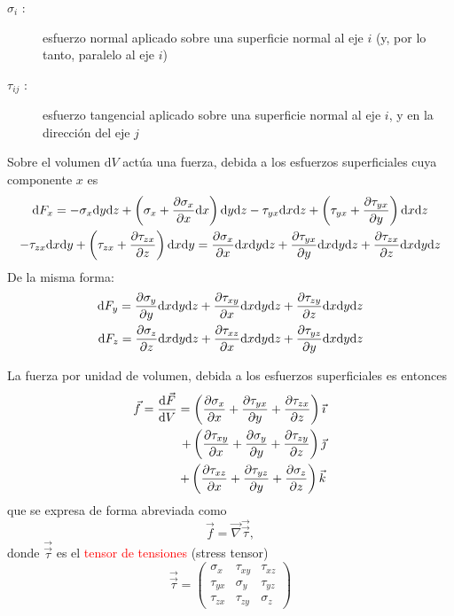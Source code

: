 \begin{description}
	\item[$\sigma_i$ :] esfuerzo normal aplicado sobre una superficie normal al eje $i$ (y, por lo tanto, paralelo al eje $i$)
	\item[$\tau_{ij}$ :] esfuerzo tangencial aplicado sobre una superficie normal al eje $i$, y en la direcci\'on del eje $j$
\end{description} 

\begin{center}
%	

\end{center}

Sobre el volumen $\text{d} V$ act\'ua una fuerza, debida a los esfuerzos superficiales cuya componente $x$ es
\begin{multline*}
	\text{d} F_x = -\sigma_x  \text{d} y \text{d} z + \left(\sigma_x + \frac{\partial \sigma_x}{\partial x} \text{d} x\right) \text{d} y \text{d} z - \tau_{yx} \text{d} x \text{d} z + \left(\tau_{yx} + \frac{\partial \tau_{yx}}{\partial y}\right) \text{d} x \text{d} z \\
	- \tau_{zx} \text{d} x \text{d} y + \left(\tau_{zx} + \frac{\partial \tau_{zx}}{\partial z}\right) \text{d} x \text{d} y
	= \frac{\partial \sigma_x}{\partial x} \text{d} x \text{d} y \text{d} z + \frac{\partial \tau_{yx}}{\partial y} \text{d} x \text{d} y \text{d} z + \frac{\partial \tau_{zx}}{\partial z}
	\text{d} x \text{d} y \text{d} z
\end{multline*}
De la misma forma:
\begin{eqnarray*}
	\text{d} F_y = \frac{\partial \sigma_y}{\partial y} \text{d} x \text{d} y \text{d} z + \frac{\partial \tau_{xy}}{\partial x} \text{d} x \text{d} y \text{d} z + \frac{\partial \tau_{zy}}{\partial z} \text{d} x \text{d} y \text{d} z \\
	\text{d} F_z = \frac{\partial \sigma_z}{\partial z} \text{d} x \text{d} y \text{d} z + \frac{\partial \tau_{xz}}{\partial x} \text{d} x \text{d} y \text{d} z + \frac{\partial \tau_{yz}}{\partial y} \text{d} x \text{d} y \text{d} z
\end{eqnarray*}

La fuerza por unidad de volumen, debida a los esfuerzos superficiales es entonces
\begin{eqnarray*}
	\vec f = \frac{\textrm{d} \vec F}{\textrm{d} V} = \left( \frac{\partial \sigma_x}{\partial x} + \frac{\partial \tau_{yx}}{\partial y} + \frac{\partial \tau_{zx}}{\partial z}\right) \vec \imath \\
	+ \left( \frac{\partial \tau_{xy}}{\partial x} + \frac{\partial \sigma_y}{\partial y} +  \frac{\partial \tau_{zy}}{\partial z} \right) \vec \jmath \\
	+ \left( \frac{\partial \tau_{xz}}{\partial x}  +  \frac{\partial \tau_{yz}}{\partial y} + \frac{\partial \sigma_z}{\partial z} \right) \vec k
\end{eqnarray*}
que se expresa de forma abreviada como
$$ \vec f = \vec \nabla \vec {\vec \tau},$$
donde $\vec {\vec \tau}$ es el \textcolor{red}{tensor de tensiones} (stress tensor)
\begin{equation*}
	\vec{\vec{\tau}} =
	\left(
	\begin{array}{ccc}
		\sigma_x & \tau_{xy} & \tau_{xz} \\
		\tau_{yx} & \sigma_y & \tau_{yz} \\
		\tau_{zx} & \tau_{zy} & \sigma_z
	\end{array}\right)
\end{equation*}

